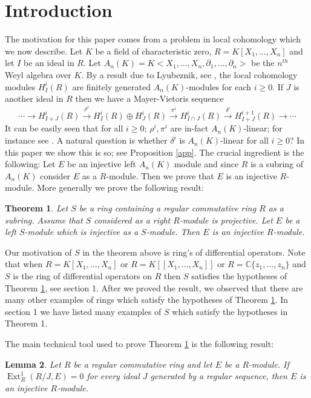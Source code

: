 \documentclass{amsart}
\theoremstyle{plain}
\newtheorem{thm}{Theorem}
\newtheorem{lem}[thm]{Lemma}
\theoremstyle{definition}
\theoremstyle{remark}
\numberwithin{equation}{theorem}
\begin{document}
\section*{Introduction}
The motivation for this paper comes from a problem in local cohomology which we now describe. Let $K$ be a field of characteristic zero, $R = K[X_1,\ldots,X_n]$ and let $I$ be an ideal in $R$. Let $A_n(K) = K<X_1,\ldots,X_n, \partial_1, \ldots, \partial_n>$  be the $n^{th}$ Weyl algebra over $K$. By a result due to Lyubeznik, see \cite{Ly}, the local cohomology modules $H^i_I(R)$ are finitely generated $A_n(K)$-modules for each $i \geq 0$. If $J$ is another
ideal in $R$ then we have a Mayer-Vietoris sequence
\[
\cdots {\rightarrow} H^{i}_{I+J}(R) \xrightarrow{\rho^i} H^i_I(R) \oplus H^i_J(R) \xrightarrow{\pi^i} H^i_{I\cap J}(R) \xrightarrow{\delta^i} H^{i+1}_{I+J}(R) {\rightarrow} \cdots
\]
It can be easily seen that for all $i \geq 0$; $\rho^i,\pi^i$ are in-fact $A_n(K)$-linear; for instance see
\cite[1.5]{P}.
 A natural question is whether
$\delta^i$ is $A_n(K)$-linear for all $i \geq 0$? In this paper we show this is so; see Proposition \ref{app}. The crucial ingredient is the following: Let $E$ be an injective left $A_n(K)$ module and since $R$ is a subring of $A_n(K)$ consider $E$
as a $R$-module. Then we prove that $E$ is an injective $R$-module. More generally we prove the following result:
\begin{thm}\label{main}
Let $S$ be a ring containing a regular commutative ring $R$ as a subring. Assume that $S$ considered as a right $R$-module is projective. Let $E$ be a left $S$-module which is injective as a $S$-module. Then $E$ is an injective $R$-module.
\end{thm}
Our motivation of $S$ in the theorem above is ring's of differential operators. Note that when $R = K[X_1,\ldots,X_n]$ or $R = K[[X_1,\ldots,X_n]]$ or $R = \mathbb{C}\{z_1,\ldots,z_n\}$ and $S$ is the ring of differential operators on $R$ then $S$ satisfies the hypotheses of Theorem \ref{main}, see section 1. After we proved the result, we observed that there are
many other examples of rings which satisfy the hypotheses of Theorem \ref{main}. In section 1 we have listed many examples  of $S$ which satisfy the hypotheses in Theorem 1.

The main technical tool used to prove Theorem \ref{main} is the following result:
\begin{lem}\label{chief}
Let $R$ be a regular commutative ring and let $E$ be a $R$-module. If ${\operatorname{Ext}}_{R}^{1}(R/J,E) = 0$ for every ideal $J$
 generated by a regular sequence, then $E$ is an injective $R$-module.
\end{lem}
\end{document}

